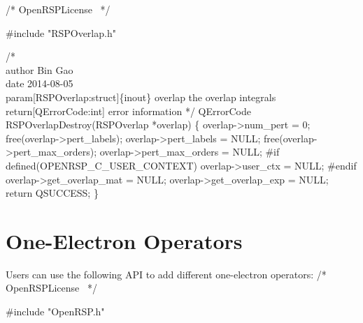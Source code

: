 \nwendcode{}\endmoddef
/*
  \LA{}OpenRSPLicense~{\nwtagstyle{}}\RA{}
*/

#include "RSPOverlap.h"

/*%
    \\author Bin Gao
    \\date 2014-08-05
    \\param[RSPOverlap:struct]\{inout\} overlap the overlap integrals
    \\return[QErrorCode:int] error information
*/
QErrorCode RSPOverlapDestroy(RSPOverlap *overlap)
\{
    overlap->num_pert = 0;
    free(overlap->pert_labels);
    overlap->pert_labels = NULL;
    free(overlap->pert_max_orders);
    overlap->pert_max_orders = NULL;
#if defined(OPENRSP_C_USER_CONTEXT)
    overlap->user_ctx = NULL;
#endif
    overlap->get_overlap_mat = NULL;
    overlap->get_overlap_exp = NULL;
    return QSUCCESS;
\}

\nwendcode{}\section{One-Electron Operators}
\label{section-OpenRSP-OneOper}

Users can use the following API to add different one-electron operators:
\nwenddocs{}\endmoddef
/*
  \LA{}OpenRSPLicense~{\nwtagstyle{}}\RA{}
*/

#include "OpenRSP.h"

